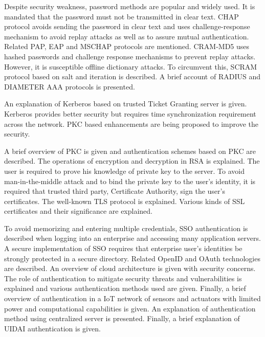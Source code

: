 \begin{multicols}{2}
Despite security weakness, password methods are popular and widely used. It is mandated that the password must not be transmitted in clear text. CHAP protocol avoids sending the password in clear text and uses challenge-response mechanism to avoid replay attacks as well as to assure mutual authentication. Related PAP, EAP and MSCHAP protocols are mentioned. CRAM-MD5 uses hashed passwords and challenge response mechanisms to prevent replay attacks. However, it is susceptible offline dictionary attacks. To circumvent this, SCRAM protocol based on salt and iteration is described. A brief account of RADIUS and DIAMETER AAA protocols is presented.

An explanation of Kerberos based on trusted Ticket Granting server is given. Kerberos provides better security but requires time synchronization requirement across the network. PKC based enhancements are being proposed to improve the security.

A brief overview of PKC is given and authentication schemes based on PKC are described. The operations of encryption and decryption in RSA is explained. The user is required to prove his knowledge of private key to the server. To avoid man-in-the-middle attack and to bind the private key to the user's identity, it is required that trusted third party, Certificate Authority, sign the user's certificates. The well-known TLS protocol is explained. Various kinds of SSL certificates and their significance are explained.

To avoid memorizing and entering multiple credentials, SSO authentication is described when logging into an enterprise and accessing many application servers. A secure implementation of SSO requires that enterprise user's identities be strongly protected in a secure directory. Related OpenID and OAuth technologies are described. An overview of cloud architecture is given with security concerns. The role of authentication to mitigate security threats and vulnerabilities is explained and various authentication methods used are given. Finally, a brief overview of authentication in a IoT network of sensors and actuators with limited power and computational capabilities is given. An explanation of authentication method using centralized server is presented. Finally, a brief explanation of UIDAI authentication is given.


\end{multicols}
